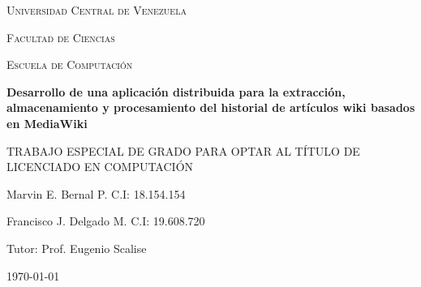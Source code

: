 \begin{titlepage}
	\centering
	{\scshape\LARGE Universidad Central de Venezuela\par}
	{\scshape\LARGE Facultad de Ciencias\par}
	{\scshape\LARGE Escuela de Computación\par}


	\vspace*{\fill}
	{\huge\bfseries Desarrollo de una aplicación distribuida para la extracción, almacenamiento y procesamiento del historial de artículos wiki basados en MediaWiki\par}
	\vspace{2cm}
	{\large TRABAJO ESPECIAL DE GRADO PARA OPTAR AL TÍTULO DE LICENCIADO EN COMPUTACIÓN\par}
	\vspace*{\fill}

	{\large Marvin E. Bernal P. C.I: 18.154.154\par}
	{\large Francisco J. Delgado M. C.I: 19.608.720\par}
	{\large Tutor: Prof. Eugenio Scalise\par}
	\vspace{1cm}
	{\large \monthyeardate\today \par}
\end{titlepage}
